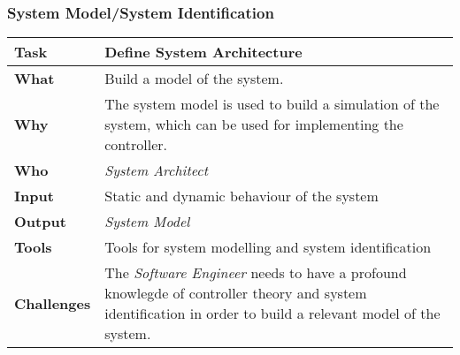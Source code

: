 \subsubsection{System Model/System Identification}
	\begin{tabularx}{\textwidth}{@{} l X @{}}
		\caption{System Model/System Identification} \label{table:ch6_Task_Controler_Tuning}\\
		\toprule 
		\bfseries Task & Define System Architecture\\
		\midrule 
		\bfseries What & Build a model of the system.\\
		\midrule 
		\bfseries Why & The system model is used to build a simulation of the system, which can be used for implementing the controller.\\
		\midrule 
		\bfseries Who & \emph{System Architect}\\
		\midrule 
		\bfseries Input & Static and dynamic behaviour of the system\\ 
		\midrule 
		\bfseries Output & \emph{System Model}\\
		\midrule 
		\bfseries Tools & Tools for system modelling and system identification\\
		\midrule 
		\bfseries Challenges & The \emph{Software Engineer} needs to have a profound knowlegde of controller theory and system identification in order to build a relevant model of the system.
			\\
		\bottomrule 
	\end{tabularx}

